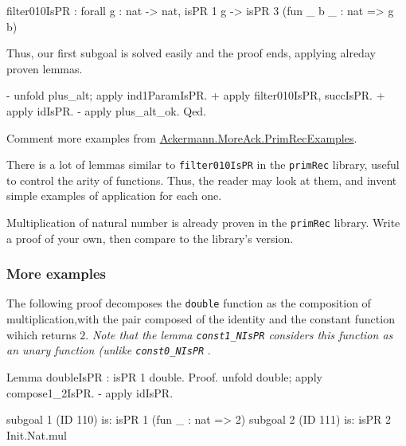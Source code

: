 \begin{Coqanswer}
filter010IsPR :
forall g : nat -> nat, isPR 1 g -> isPR 3 (fun _ b _ : nat => g b)
\end{Coqanswer}

Thus, our first subgoal is solved easily and the proof ends, applying alreday proven lemmas.


\begin{Coqsrc}
 - unfold plus_alt; apply ind1ParamIsPR.
    + apply filter010IsPR, succIsPR.
    + apply idIsPR.
  - apply plus_alt_ok. 
Qed.
\end{Coqsrc}


\begin{todo}
Comment more examples from   \href{../theories/html/hydras.Ackermann.MoreAck.PrimRecExamples.html}{Ackermann.MoreAck.PrimRecExamples}.
\end{todo}


\begin{exercise}
There is a lot of lemmas similar to \texttt{filter010IsPR} in the \texttt{primRec} library, useful to control the arity of functions.
Thus, the reader may look at them, and invent simple examples of application for each one.
\end{exercise}

\begin{exercise}
Multiplication of natural number is already proven in the \texttt{primRec} library. Write a proof of your own, then compare to the library's version.
\end{exercise}

\subsubsection{More examples}

The following proof decomposes the \texttt{double} function as the composition of 
multiplication,with the pair composed of the identity and the constant function wihich returns $2$.
\emph{Note that the lemma \texttt{const1\_NIsPR} considers this function as an unary function (unlike \texttt{const0\_NIsPR} }. 

\begin{Coqsrc}
Lemma doubleIsPR : isPR 1 double.
Proof.
  unfold double; apply compose1_2IsPR.
  - apply idIsPR.
\end{Coqsrc}

\begin{Coqanswer}
subgoal 1 (ID 110) is:
 isPR 1 (fun _ : nat => 2)
subgoal 2 (ID 111) is:
 isPR 2 Init.Nat.mul
\end{Coqanswer}


